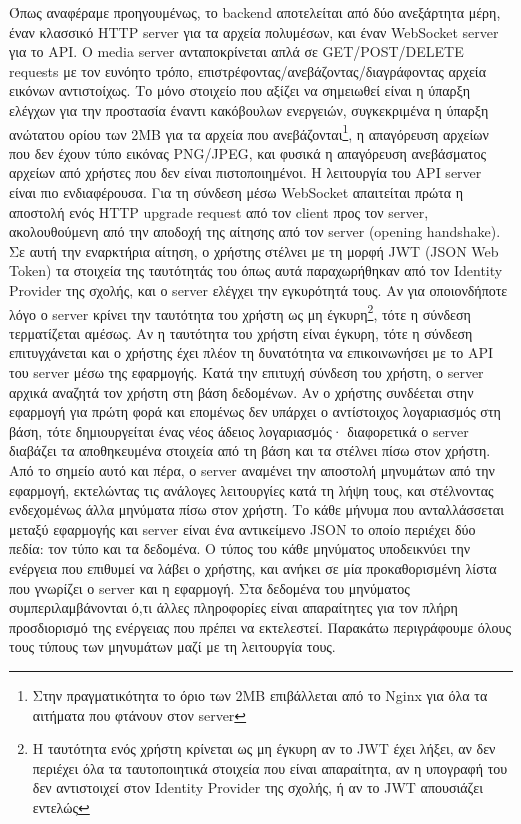 \documentclass[../thesis.tex]{subfiles}
\begin{document}
Όπως αναφέραμε προηγουμένως, το backend αποτελείται από δύο ανεξάρτητα μέρη, έναν κλασσικό HTTP server για τα αρχεία πολυμέσων, και έναν WebSocket server για το API.
Ο media server ανταποκρίνεται απλά σε GET/POST/DELETE requests με τον ευνόητο τρόπο, επιστρέφοντας/ανεβάζοντας/διαγράφοντας αρχεία εικόνων αντιστοίχως.
Το μόνο στοιχείο που αξίζει να σημειωθεί είναι η ύπαρξη ελέγχων για την προστασία έναντι κακόβουλων ενεργειών, συγκεκριμένα η ύπαρξη ανώτατου ορίου των 2MB για τα αρχεία που ανεβάζονται\footnote{Στην πραγματικότητα το όριο των 2MB επιβάλλεται από το Nginx για όλα τα αιτήματα που φτάνουν στον server}, η απαγόρευση αρχείων που δεν έχουν τύπο εικόνας PNG/JPEG, και φυσικά η απαγόρευση ανεβάσματος αρχείων από χρήστες που δεν είναι πιστοποιημένοι.
Η λειτουργία του API server είναι πιο ενδιαφέρουσα.
Για τη σύνδεση μέσω WebSocket απαιτείται πρώτα η αποστολή ενός HTTP upgrade request από τον client προς τον server, ακολουθούμενη από την αποδοχή της αίτησης από τον server (opening handshake).
Σε αυτή την εναρκτήρια αίτηση, ο χρήστης στέλνει με τη μορφή JWT (JSON Web Token) τα στοιχεία της ταυτότητάς του όπως αυτά παραχωρήθηκαν από τον Identity Provider της σχολής, και ο server ελέγχει την εγκυρότητά τους.
Αν για οποιονδήποτε λόγο ο server κρίνει την ταυτότητα του χρήστη ως μη έγκυρη\footnote{Η ταυτότητα ενός χρήστη κρίνεται ως μη έγκυρη αν το JWT έχει λήξει, αν δεν περιέχει όλα τα ταυτοποιητικά στοιχεία που είναι απαραίτητα, αν η υπογραφή του δεν αντιστοιχεί στον Identity Provider της σχολής, ή αν το JWT απουσιάζει εντελώς}, τότε η σύνδεση τερματίζεται αμέσως.
Αν η ταυτότητα του χρήστη είναι έγκυρη, τότε η σύνδεση επιτυγχάνεται και ο χρήστης έχει πλέον τη δυνατότητα να επικοινωνήσει με το API του server μέσω της εφαρμογής.
Κατά την επιτυχή σύνδεση του χρήστη, ο server αρχικά αναζητά τον χρήστη στη βάση δεδομένων.
Αν ο χρήστης συνδέεται στην εφαρμογή για πρώτη φορά και επομένως δεν υπάρχει ο αντίστοιχος λογαριασμός στη βάση, τότε δημιουργείται ένας νέος άδειος λογαριασμός· διαφορετικά ο server διαβάζει τα αποθηκευμένα στοιχεία από τη βάση και τα στέλνει πίσω στον χρήστη.
Από το σημείο αυτό και πέρα, ο server αναμένει την αποστολή μηνυμάτων από την εφαρμογή, εκτελώντας τις ανάλογες λειτουργίες κατά τη λήψη τους, και στέλνοντας ενδεχομένως άλλα μηνύματα πίσω στον χρήστη.
Το κάθε μήνυμα που ανταλλάσσεται μεταξύ εφαρμογής και server είναι ένα αντικείμενο JSON το οποίο περιέχει δύο πεδία: τον τύπο και τα δεδομένα.
Ο τύπος του κάθε μηνύματος υποδεικνύει την ενέργεια που επιθυμεί να λάβει ο χρήστης, και ανήκει σε μία προκαθορισμένη λίστα που γνωρίζει ο server και η εφαρμογή.
Στα δεδομένα του μηνύματος συμπεριλαμβάνονται ό,τι άλλες πληροφορίες είναι απαραίτητες για τον πλήρη προσδιορισμό της ενέργειας που πρέπει να εκτελεστεί.
Παρακάτω περιγράφουμε όλους τους τύπους των μηνυμάτων μαζί με τη λειτουργία τους.
\end{document}

